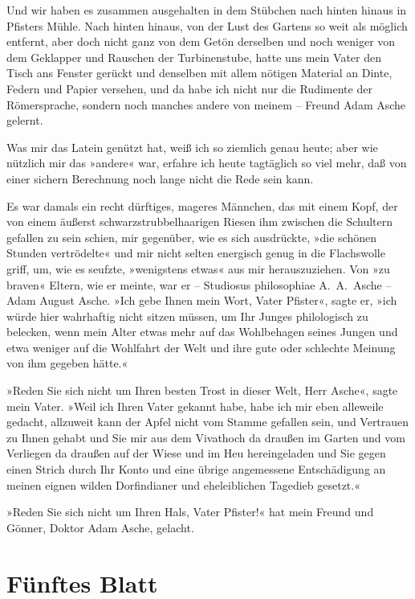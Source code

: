 Und wir haben es zusammen ausgehalten in dem Stübchen nach hinten
hinaus in Pfisters Mühle. Nach hinten hinaus, von der Lust des
Gartens so weit als möglich entfernt, aber doch nicht ganz von dem
Getön derselben und noch weniger von dem Geklapper und Rauschen der
Turbinenstube, hatte uns mein Vater den Tisch ans Fenster gerückt
und denselben mit allem nötigen Material an Dinte, Federn und
Papier versehen, und da habe ich nicht nur die Rudimente der
Römersprache, sondern noch manches andere von meinem – Freund Adam
Asche gelernt.

Was mir das Latein genützt hat, weiß ich so ziemlich genau heute;
aber wie nützlich mir das »andere« war, erfahre ich heute
tagtäglich so viel mehr, daß von einer sichern Berechnung noch
lange nicht die Rede sein kann.

Es war damals ein recht dürftiges, mageres Männchen, das mit einem
Kopf, der von einem äußerst schwarzstrubbelhaarigen Riesen ihm
zwischen die Schultern gefallen zu sein schien, mir gegenüber, wie
es sich ausdrückte, »die schönen Stunden vertrödelte« und mir nicht
selten energisch genug in die Flachswolle griff, um, wie es
seufzte, »wenigstens etwas« aus mir herauszuziehen. Von »zu braven«
Eltern, wie er meinte, war er – Studiosus philosophiae A.~A.~Asche
– Adam August Asche. »Ich gebe Ihnen mein Wort, Vater Pfister«,
sagte er, »ich würde hier wahrhaftig nicht sitzen müssen, um Ihr
Junges philologisch zu belecken, wenn mein Alter etwas mehr auf das
Wohlbehagen seines Jungen und etwa weniger auf die Wohlfahrt der
Welt und ihre gute oder schlechte Meinung von ihm gegeben hätte.«

»Reden Sie sich nicht um Ihren besten Trost in dieser Welt, Herr
Asche«, sagte mein Vater. »Weil ich Ihren Vater gekannt habe, habe
ich mir eben alleweile gedacht, allzuweit kann der Apfel nicht vom
Stamme gefallen sein, und Vertrauen zu Ihnen gehabt und Sie mir aus
dem Vivathoch da draußen im Garten und vom Verliegen da draußen auf
der Wiese und im Heu hereingeladen und Sie gegen einen Strich durch
Ihr Konto und eine übrige angemessene Entschädigung an meinen
eignen wilden Dorfindianer und eheleiblichen Tagedieb gesetzt.«

»Reden Sie sich nicht um Ihren Hals, Vater Pfister!« hat mein
Freund und Gönner, Doktor Adam Asche, gelacht.

\section{Fünftes Blatt}

